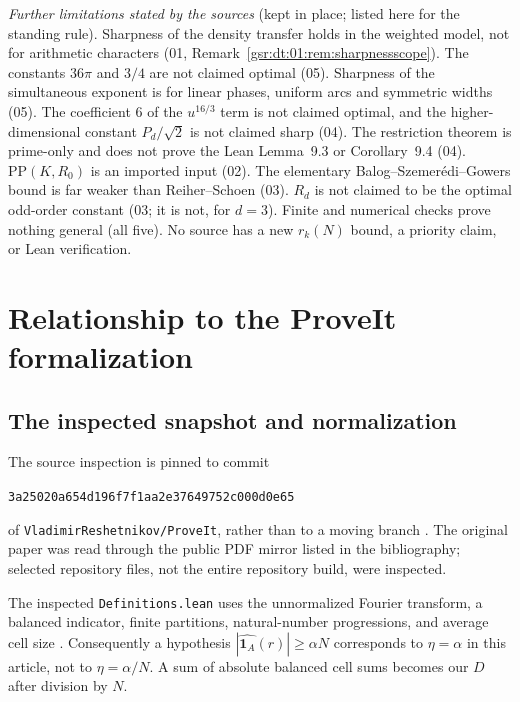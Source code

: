 \documentclass[11pt,letterpaper]{article}
\numberwithin{equation}{section}
\theoremstyle{definition}
\theoremstyle{remark}
\newcommand{\one}{\mathbf 1}
\newcommand{\1}{\mathbf 1}
\newcommand{\code}[1]{\texttt{\small #1}}
\newcommand{\snapshot}{\texttt{3a25020a654d196f7f1aa2e37649752c000d0e65}}
\newcommand{\srctag}[1]{\texorpdfstring{\enspace\textup{[#1]}}{ [#1]}}
\newcommand{\srcnote}[2]{\par\noindent{\small\textit{Source #1, delivered #2.}}\par}
\begin{document}
\emph{Further limitations stated by the sources} (kept in place; listed here for the standing rule). Sharpness of the density transfer holds in the weighted model, not for arithmetic characters (01, Remark~\ref{gsr:dt:01:rem:sharpnessscope}). The constants $36\pi$ and $3/4$ are not claimed optimal (05). Sharpness of the simultaneous exponent is for linear phases, uniform arcs and symmetric widths (05). The coefficient $6$ of the $u^{16/3}$ term is not claimed optimal, and the higher-dimensional constant $P_d/\sqrt2$ is not claimed sharp (04). The restriction theorem is prime-only and does not prove the Lean Lemma~9.3 or Corollary~9.4 (04). $\mathrm{PP}(K,R_0)$ is an imported input (02). The elementary Balog--Szemer\'edi--Gowers bound is far weaker than Reiher--Schoen (03). $R_d$ is not claimed to be the optimal odd-order constant (03; it is not, for $d=3$). Finite and numerical checks prove nothing general (all five). No source has a new $r_k(N)$ bound, a priority claim, or Lean verification.
\section[{Relationship to the ProveIt formalization\srctag{01}}]{Relationship to the ProveIt formalization}\label{gsr:fz:01:sec:d14}\label{gsr:fz:01:sec:formal}
\srcnote{01}{Section 14}

\subsection{The inspected snapshot and normalization}
The source inspection is pinned to commit
\begin{center}\small\snapshot\end{center}
of \code{VladimirReshetnikov/ProveIt}, rather than to a moving branch
\cite{repo01}. The original paper was read through the public PDF mirror
listed in the bibliography; selected repository files, not the entire
repository build, were inspected.

The inspected \code{Definitions.lean} uses the unnormalized Fourier
transform, a balanced indicator, finite partitions, natural-number
progressions, and average cell size \cite{repo01defs}. Consequently a
hypothesis $|\widehat{\one_A}(r)|\ge\alpha N$ corresponds to $\eta=\alpha$
in this article, not to $\eta=\alpha/N$. A sum of absolute balanced cell
sums becomes our $D$ after division by $N$.
\end{document}
